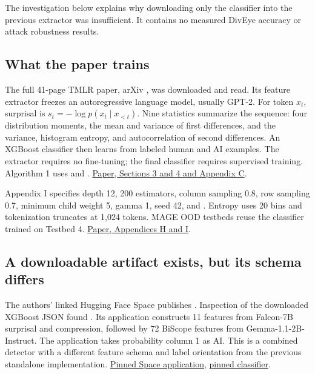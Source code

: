 The investigation below explains why downloading only the classifier
into the previous extractor was insufficient. It contains no measured
DivEye accuracy or attack robustness results.

\subsection{What the paper
trains}\label{record-docs-diveye-classifier-md-what-the-paper-trains}

The full 41-page TMLR paper, arXiv \texttt{}, was
downloaded and read. Its feature extractor freezes an autoregressive
language model, usually GPT-2. For token \(x_t\), surprisal is
\(s_t=-\log p(x_t\mid x_{<t})\). Nine statistics summarize the sequence:
four distribution moments, the mean and variance of first differences,
and the variance, histogram entropy, and autocorrelation of second
differences. An XGBoost classifier then learns from labeled human and AI
examples. The extractor requires no fine-tuning; the final classifier
requires supervised training. Algorithm 1 uses \texttt{}
and \texttt{}.
\href{https://arxiv.org/pdf/2509.18880v3}{Paper, Sections 3 and 4 and
Appendix C}.

Appendix I specifies depth 12, 200 estimators, column sampling 0.8, row
sampling 0.7, minimum child weight 5, gamma 1, seed 42, and
\texttt{}.
Entropy uses 20 bins and tokenization truncates at 1,024 tokens. MAGE
OOD testbeds reuse the classifier trained on Testbed 4.
\href{https://arxiv.org/pdf/2509.18880v3}{Paper, Appendices H and I}.

\subsection{A downloadable artifact exists, but its schema
differs}\label{record-docs-diveye-classifier-md-a-downloadable-artifact-exists-but-its-schema-differs}

The authors' linked Hugging Face Space publishes
\texttt{}. Inspection of the downloaded XGBoost
JSON found \texttt{}. Its application
constructs 11 features from Falcon-7B surprisal and compression,
followed by 72 BiScope features from Gemma-1.1-2B-Instruct. The
application takes probability column 1 as AI. This is a combined
detector with a different feature schema and label orientation from the
previous standalone implementation.
\href{https://huggingface.co/spaces/pinyuchen/Diveye_AI_text_detector/blob/d2961b844705c0aa6f95ded41dc24ba18d2d445f/app.py}{Pinned
Space application},
\href{https://huggingface.co/spaces/pinyuchen/Diveye_AI_text_detector/blob/d2961b844705c0aa6f95ded41dc24ba18d2d445f/model.json}{pinned
classifier}.

